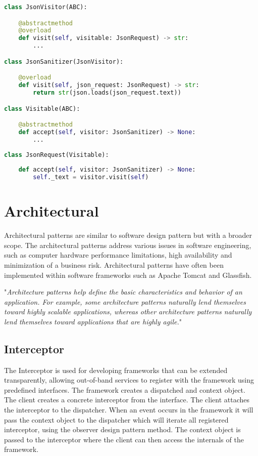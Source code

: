 \begin{lstlisting}[language=Python]
class JsonVisitor(ABC):

	@abstractmethod
	@overload
	def visit(self, visitable: JsonRequest) -> str:
		...

class JsonSanitizer(JsonVisitor):

	@overload
	def visit(self, json_request: JsonRequest) -> str:
		return str(json.loads(json_request.text))

class Visitable(ABC):

	@abstractmethod
	def accept(self, visitor: JsonSanitizer) -> None:
		...
	
class JsonRequest(Visitable):
	
	def accept(self, visitor: JsonSanitizer) -> None:
		self._text = visitor.visit(self)

\end{lstlisting}

\section{Architectural}
Architectural patterns are similar to software design pattern but with a broader scope. The architectural patterns address various issues in software engineering, such as computer hardware performance limitations, high availability and minimization of a business risk. Architectural patterns have often been implemented within software frameworks such as Apache Tomcat and Glassfish.

"\textit{Architecture patterns help define the basic characteristics and behavior of an application. For example, some architecture patterns naturally lend themselves toward highly scalable applications,
whereas other architecture patterns naturally lend themselves toward applications that are highly agile.}" \citep{patterns}

\subsection{Interceptor}
The Interceptor is used for developing frameworks that can be extended transparently, allowing out-of-band services to register with the framework using predefined interfaces. The framework creates  a dispatched and context object. The client creates a concrete interceptor from the interface. The client attaches the interceptor to the dispatcher. When an event occurs in the framework it will pass the context object to the dispatcher which will iterate all registered interceptor, using the observer design pattern method. The context object is passed to the interceptor where the client can then access the internals of the framework.


